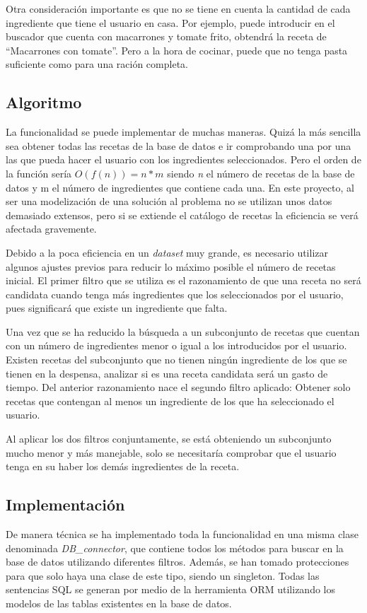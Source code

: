 Otra consideración importante es que no se tiene en cuenta la cantidad de cada ingrediente que tiene el usuario en casa. Por ejemplo, puede introducir en el buscador que cuenta con macarrones y tomate frito, obtendrá la receta de ``Macarrones con tomate''. Pero a la hora de cocinar, puede que no tenga pasta suficiente como para una ración completa.

\subsection{Algoritmo}
La funcionalidad se puede implementar de muchas maneras. Quizá la más sencilla sea obtener todas las recetas de la base de datos e ir comprobando una por una las que pueda hacer el usuario con los ingredientes seleccionados. Pero el orden de la función sería  $O(f(n))=n*m$ siendo \textit{n} el número de recetas de la base de datos y m el número de ingredientes que contiene cada una. En este proyecto, al ser una modelización de una solución al problema no se utilizan unos datos demasiado extensos, pero si se extiende el catálogo de recetas la eficiencia se verá afectada gravemente.

Debido a la poca eficiencia en un \emph{\gls{dataset}} muy grande, es necesario utilizar algunos ajustes previos para reducir lo máximo posible el número de recetas inicial. El primer filtro que se utiliza es el razonamiento de que una receta no será candidata cuando tenga más ingredientes que los seleccionados por el usuario, pues significará que existe un ingrediente que falta. 

Una vez que se ha reducido la búsqueda a un subconjunto de recetas que cuentan con un número de ingredientes menor o igual a los introducidos por el usuario. Existen recetas del subconjunto que no tienen ningún ingrediente de los que se tienen en la despensa, analizar si es una receta candidata será un gasto de tiempo. Del anterior razonamiento nace el segundo filtro aplicado: Obtener solo recetas que contengan al menos un ingrediente de los que ha seleccionado el usuario. 

Al aplicar los dos filtros conjuntamente, se está obteniendo un subconjunto mucho menor y más manejable, solo se necesitaría comprobar que el usuario tenga en su haber los demás ingredientes de la receta.

\subsection{Implementación}
De manera técnica se ha implementado toda la funcionalidad en una misma clase denominada \textit{DB_connector}, que contiene todos los métodos para buscar en la base de datos utilizando diferentes filtros. Además, se han tomado protecciones para que solo haya una clase de este tipo, siendo un \gls{singleton}. Todas las sentencias \gls{SQL} se generan por medio de la herramienta \gls{ORM} utilizando los modelos de las tablas existentes en la base de datos.

